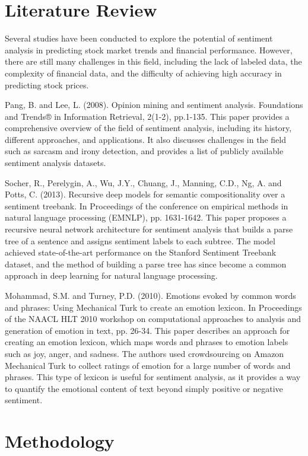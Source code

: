 \documentclass{article}
\begin{document}
\section{Literature Review}

Several studies have been conducted to explore the potential of sentiment analysis in predicting stock market trends and financial performance. However, there are still many challenges in this field, including the lack of labeled data, the complexity of financial data, and the difficulty of achieving high accuracy in predicting stock prices.

Pang, B. and Lee, L. (2008). Opinion mining and sentiment analysis. Foundations and Trends® in Information Retrieval, 2(1-2), pp.1-135.
This paper provides a comprehensive overview of the field of sentiment analysis, including its history, different approaches, and applications. It also discusses challenges in the field such as sarcasm and irony detection, and provides a list of publicly available sentiment analysis datasets.

Socher, R., Perelygin, A., Wu, J.Y., Chuang, J., Manning, C.D., Ng, A. and Potts, C. (2013). Recursive deep models for semantic compositionality over a sentiment treebank. In Proceedings of the conference on empirical methods in natural language processing (EMNLP), pp. 1631-1642. This paper proposes a recursive neural network architecture for sentiment analysis that builds a parse tree of a sentence and assigns sentiment labels to each subtree. The model achieved state-of-the-art performance on the Stanford Sentiment Treebank dataset, and the method of building a parse tree has since become a common approach in deep learning for natural language processing.

Mohammad, S.M. and Turney, P.D. (2010). Emotions evoked by common words and phrases: Using Mechanical Turk to create an emotion lexicon. In Proceedings of the NAACL HLT 2010 workshop on computational approaches to analysis and generation of emotion in text, pp. 26-34. This paper describes an approach for creating an emotion lexicon, which maps words and phrases to emotion labels such as joy, anger, and sadness. The authors used crowdsourcing on Amazon Mechanical Turk to collect ratings of emotion for a large number of words and phrases. This type of lexicon is useful for sentiment analysis, as it provides a way to quantify the emotional content of text beyond simply positive or negative sentiment.
\section{Methodology}
\end{document}
